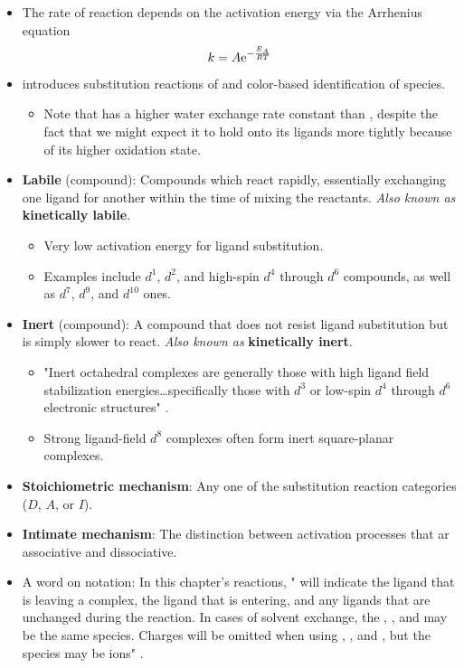 \documentclass[../notes.tex]{subfiles}
\begin{document}
\begin{itemize}
    \item The rate of reaction depends on the activation energy via the Arrhenius equation
    \begin{equation*}
        k = A\e[-\frac{E_A}{RT}]
    \end{equation*}
    \item \textcite{bib:MiesslerFischerTarr} introduces substitution reactions of  and color-based identification of species.
    \begin{itemize}
        \item Note that  has a higher water exchange rate constant than , despite the fact that we might expect it to hold onto its ligands more tightly because of its higher oxidation state.
    \end{itemize}
    \item \textbf{Labile} (compound): Compounds which react rapidly, essentially exchanging one ligand for another within the time of mixing the reactants. \emph{Also known as} \textbf{kinetically labile}.
    \begin{itemize}
        \item Very low activation energy for ligand substitution.
        \item Examples include $d^1$, $d^2$, and high-spin $d^4$ through $d^6$ compounds, as well as $d^7$, $d^9$, and $d^{10}$ ones.
    \end{itemize}
    \item \textbf{Inert} (compound): A compound that does not resist ligand substitution but is simply slower to react. \emph{Also known as} \textbf{kinetically inert}.
    \begin{itemize}
        \item "Inert octahedral complexes are generally those with high ligand field stabilization energies\dots specifically those with $d^3$ or low-spin $d^4$ through $d^6$ electronic structures" \parencite[440-41]{bib:MiesslerFischerTarr}.
        \item Strong ligand-field $d^8$ complexes often form inert square-planar complexes.
    \end{itemize}
    \item \textbf{Stoichiometric mechanism}: Any one of the substitution reaction categories ($D$, $A$, or $I$).
    \item \textbf{Intimate mechanism}: The distinction between activation processes that ar associative and dissociative.
    \item A word on notation: In this chapter's reactions, " will indicate the ligand that is leaving a complex,  the ligand that is entering, and  any ligands that are unchanged during the reaction. In cases of solvent exchange, the , , and  may be the same species. Charges will be omitted when using , , and , but the species may be ions" \parencite[441]{bib:MiesslerFischerTarr}.

\end{itemize}
\end{document}
